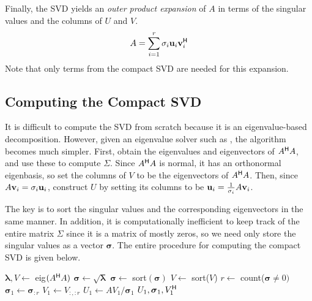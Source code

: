 Finally, the SVD yields an \emph{outer product expansion} of $A$ in terms of the singular values and the columns of $U$ and $V$.
\begin{equation}
\label{eq:svd-outer-product}
A = \sum_{i=1}^r \sigma_i\mathbf{u}_i\mathbf{v}^{\mathsf H}_i
\end{equation}
Note that only terms from the compact SVD are needed for this expansion.

\subsection*{Computing the Compact SVD} %

It is difficult to compute the SVD from scratch because it is an eigenvalue-based decomposition.
However, given an eigenvalue solver such as , the algorithm becomes much simpler.
First, obtain the eigenvalues and eigenvectors of $A^{\mathsf H} A$, and use these to compute $\Sigma$.
Since $A^{\mathsf H} A$ is normal, it has an orthonormal eigenbasis, so set the columns of $V$ to be the eigenvectors of $A^{\mathsf H} A$.
Then, since $A\mathbf{v}_i = \sigma_i \mathbf{u}_i$, construct $U$ by setting its columns to be $\mathbf{u}_i = \frac{1}{\sigma_i}A\mathbf{v}_i$.

The key is to sort the singular values and the corresponding eigenvectors in the same manner.
In addition, it is computationally inefficient to keep track of the entire matrix $\Sigma$ since it is a matrix of mostly zeros, so we need only store the singular values as a vector $\boldsymbol{\sigma}$.
The entire procedure for computing the compact SVD is given below.

\begin{algorithm} %
\begin{algorithmic}[1]
\State $\boldsymbol{\lambda}, V \gets$ eig$(A^{\mathsf H} A)$
\State $\boldsymbol{\sigma} \gets \sqrt{\boldsymbol{\lambda}}$
\State $\boldsymbol{\sigma} \gets$ sort$(\boldsymbol{\sigma})$
    \label{step:sort-singular-values}
\State $V \gets$ sort($V$)
\State $r \gets $ count($\boldsymbol{\sigma} \ne 0)$
    \label{step:nonzero-singular-values}
\State $\boldsymbol{\sigma}_1 \gets \boldsymbol{\sigma}_{:r}$
\State $V_1 \gets V_{:,:r}$
\State $U_1 \gets AV_1 / \boldsymbol{\sigma}_1$
    \label{step:SVD-construct-U}
\State {} $U_1, \boldsymbol{\sigma}_1, V^{\mathsf H}_1$
\EndProcedure
\caption{}
\label{alg:compact-svd}
\end{algorithmic}
\end{algorithm}

